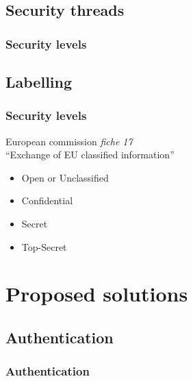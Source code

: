 \documentclass{beamer}
\begin{document}
\subsection{Security threads}

\begin{frame}
\frametitle{Security levels}
    
\end{frame}

\subsection{Labelling}

\begin{frame}
\frametitle{Security levels}
    European commission \emph{fiche 17} \\``Exchange of EU classified information'' \cite{fiche17EU}
    \begin{itemize}
        \item Open or Unclassified
        \item Confidential
        \item Secret
        \item Top-Secret
    \end{itemize}

\end{frame}

\section{Proposed solutions}


\subsection{Authentication}

\begin{frame}
\frametitle{Authentication}
\end{frame}
\end{document}
